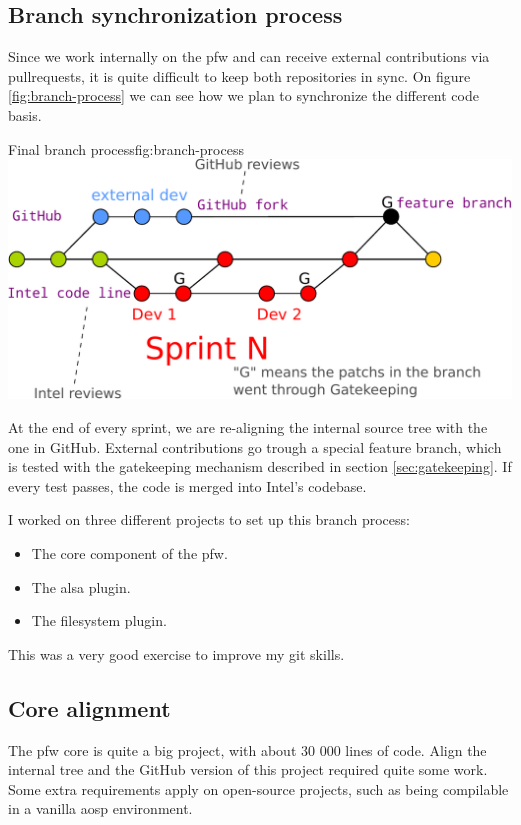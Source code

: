 \subsection{Branch synchronization process}\label{sec:syncProcess}
Since we work internally on the \gls{pfw} and can receive external contributions via \gls{pullrequests},
it is quite difficult to keep both repositories in sync.
On figure \ref{fig:branch-process} we can see how we plan to synchronize the different code basis.

\begin{figureGraphics}{Final branch process}{fig:branch-process}
    \includegraphics[width=\textwidth]{./src/img/branches-process-crop.pdf}
\end{figureGraphics}
At the end of every sprint, we are re-aligning the internal source tree with the one in \gls{GitHub}.
External contributions go trough a special feature branch, which is tested with the gatekeeping mechanism described in section \ref{sec:gatekeeping}.
If every test passes, the code is merged into Intel's codebase.

I worked on three different projects to set up this branch process:
\begin{itemize}
    \item The core component of the \gls{pfw}.
    \item The \gls{alsa} plugin.
    \item The filesystem plugin.
\end{itemize}

This was a very good exercise to improve my \gls{git} skills.

\subsection{Core alignment}
The \gls{pfw} core is quite a big project, with about 30 000 lines of code.
Align the internal tree and the \gls{GitHub} version of this project required quite some work.
Some extra requirements apply on open-source projects, such as being compilable in a \gls{vanilla} \gls{aosp} environment.

